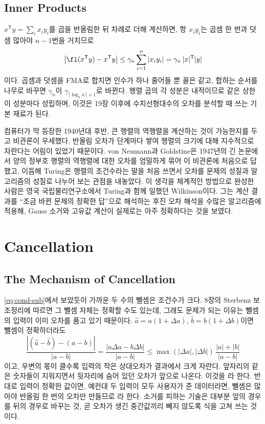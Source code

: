 \subsection{Inner Products}

$x^{\mathsf T}y=\sum_ix_iy_i$를 곱을 반올림한 뒤 차례로 더해 계산하면, 항 $x_iy_i$는 곱셈 한 번과 덧셈 많아야 $n-1$번을 거치므로
\[
\bigl|\fl(x^{\mathsf T}y)-x^{\mathsf T}y\bigr|\le\gamma_n\sum_{i=1}^n|x_iy_i|=\gamma_n\,|x|^{\mathsf T}|y|
\]
이다. 곱셈과 덧셈을 FMA로 합치면 인수가 하나 줄어들 뿐 꼴은 같고, 합하는 순서를 나무로 바꾸면 $\gamma_n$이 $\gamma_{\lceil\log_2n\rceil+1}$로 바뀐다. 행렬 곱의 각 성분은 내적이므로 같은 상한이 성분마다 성립하며, 이것은 19장 이후에 수치선형대수의 오차를 분석할 때 쓰는 기본 재료가 된다.

\begin{aside}[후진 오차 해석의 탄생]
컴퓨터가 막 등장한 1940년대 후반, 큰 행렬의 역행렬을 계산하는 것이 가능한지를 두고 비관론이 우세했다. 반올림 오차가 단계마다 쌓여 행렬의 크기에 대해 지수적으로 자란다는 어림이 있었기 때문이다. von Neumann과 Goldstine은 1947년의 긴 논문에서 양의 정부호 행렬의 역행렬에 대한 오차를 엄밀하게 묶어 이 비관론에 처음으로 답했고\cite{vonneumann1947}, 이듬해 Turing은 행렬의 조건수라는 말을 처음 쓰면서 오차를 문제의 성질과 알고리즘의 성질로 나누어 보는 관점을 내놓았다\cite{turing1948}. 이 생각을 체계적인 방법으로 완성한 사람은 영국 국립물리연구소에서 Turing과 함께 일했던 Wilkinson이다. 그는 계산 결과를 ``조금 바뀐 문제의 정확한 답''으로 해석하는 후진 오차 해석을 수많은 알고리즘에 적용해, Gauss 소거와 고유값 계산이 실제로는 아주 정확하다는 것을 보였다\cite{wilkinson1963rounding}.
\end{aside}

\section{Cancellation}
\label{sec:cancellation}

\subsection{The Mechanism of Cancellation}

\cref{eq:cond-sub}에서 보았듯이 가까운 두 수의 뺄셈은 조건수가 크다. 8장의 Sterbenz 보조정리에 따르면 그 뺄셈 자체는 정확할 수도 있는데, 그래도 문제가 되는 이유는 뺄셈의 입력이 이미 오차를 품고 있기 때문이다. $\hat a=a(1+\Delta a)$, $\hat b=b(1+\Delta b)$이면 뺄셈이 정확하더라도
\[
\frac{|(\hat a-\hat b)-(a-b)|}{|a-b|}=\frac{|a\Delta a-b\Delta b|}{|a-b|}\le\max(|\Delta a|,|\Delta b|)\,\frac{|a|+|b|}{|a-b|}
\]
이고, 우변의 몫이 클수록 입력의 작은 상대오차가 결과에서 크게 자란다. 앞자리의 같은 숫자들이 지워지면서 뒷자리에 숨어 있던 오차가 앞으로 나온다. 이것을 라 한다. 반대로 입력이 정확한 값이면, 예컨대 두 입력이 모두 사용자가 준 데이터라면, 뺄셈은 많아야 반올림 한 번의 오차만 만들므로 라 한다. 소거를 피하는 기술은 대부분 앞의 경우를 뒤의 경우로 바꾸는 것, 곧 오차가 생긴 중간값끼리 빼지 않도록 식을 고쳐 쓰는 것이다.

